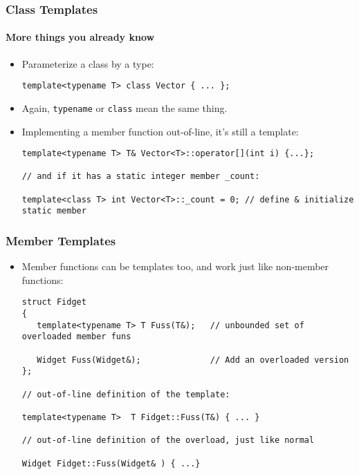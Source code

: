\begin{frame}[fragile,t]
\frametitle{Class Templates}
\framesubtitle{More things you already know}
\begin{itemize}[<+->]
\item Parameterize a class by a type:
{\scriptsize
\begin{verbatim}
template<typename T> class Vector { ... };
\end{verbatim}
}
\item Again, \texttt{typename} or \texttt{class} mean the same thing.
\item Implementing a member function out-of-line, it's still a template:
{\scriptsize
\begin{verbatim}
template<typename T> T& Vector<T>::operator[](int i) {...};

// and if it has a static integer member _count:

template<class T> int Vector<T>::_count = 0; // define & initialize static member

\end{verbatim}
}
\end{itemize}

\end{frame}

\begin{frame}[fragile,t]
\frametitle{Member Templates}
\begin{itemize}[<+->]
\item Member functions can be templates too, and work just like non-member functions:
{\scriptsize
\begin{verbatim}
struct Fidget
{
   template<typename T> T Fuss(T&);   // unbounded set of overloaded member funs

   Widget Fuss(Widget&);              // Add an overloaded version
};

// out-of-line definition of the template:

template<typename T>  T Fidget::Fuss(T&) { ... }

// out-of-line definition of the overload, just like normal

Widget Fidget::Fuss(Widget& ) { ...}
\end{verbatim}
}

\end{itemize}

\end{frame}


